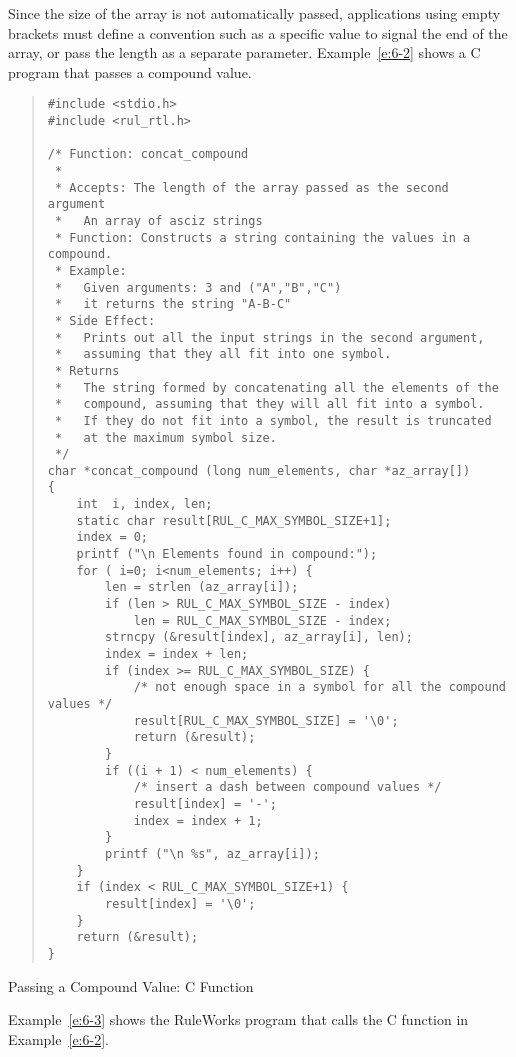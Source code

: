 Since the size of the array is not automatically passed, applications
using empty brackets must define a convention such as a specific value
to signal the end of the array, or pass the length as a separate
parameter. Example~\ref{e:6-2} shows a C program that passes a
compound value.

\begin{example}[!h]
\renewcommand{\baselinestretch}{0.9}
\begin{quote}
\begin{verbatim}
#include <stdio.h>
#include <rul_rtl.h>

/* Function: concat_compound
 *
 * Accepts: The length of the array passed as the second argument
 *   An array of asciz strings
 * Function: Constructs a string containing the values in a compound.
 * Example:
 *   Given arguments: 3 and ("A","B","C")
 *   it returns the string "A-B-C"
 * Side Effect:
 *   Prints out all the input strings in the second argument,
 *   assuming that they all fit into one symbol.
 * Returns
 *   The string formed by concatenating all the elements of the
 *   compound, assuming that they will all fit into a symbol.
 *   If they do not fit into a symbol, the result is truncated
 *   at the maximum symbol size.
 */
char *concat_compound (long num_elements, char *az_array[])
{
    int  i, index, len;
    static char result[RUL_C_MAX_SYMBOL_SIZE+1];
    index = 0;
    printf ("\n Elements found in compound:");
    for ( i=0; i<num_elements; i++) {
        len = strlen (az_array[i]);
        if (len > RUL_C_MAX_SYMBOL_SIZE - index)
            len = RUL_C_MAX_SYMBOL_SIZE - index;
        strncpy (&result[index], az_array[i], len);
        index = index + len;
        if (index >= RUL_C_MAX_SYMBOL_SIZE) {
            /* not enough space in a symbol for all the compound values */
            result[RUL_C_MAX_SYMBOL_SIZE] = '\0';
            return (&result);
        }
        if ((i + 1) < num_elements) {
            /* insert a dash between compound values */
            result[index] = '-';
            index = index + 1;
        }
        printf ("\n %s", az_array[i]);
    }
    if (index < RUL_C_MAX_SYMBOL_SIZE+1) {
        result[index] = '\0';
    }
    return (&result);
}
\end{verbatim}
\end{quote}
\caption{Passing a Compound Value: C Function}
\label{e:6-2}
\end{example}

Example~\ref{e:6-3} shows the RuleWorks program that calls the C function in
Example~\ref{e:6-2}.

